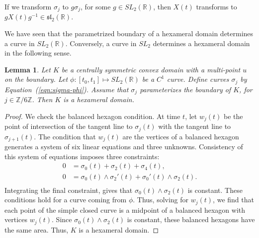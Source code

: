 \documentclass[11pt]{amsart}
\newtheorem{lemma}{Lemma}
\newcommand{\ring}[1]{\mathbb{#1}}
\def\rR{{\ring{R}}}
\begin{document}
If we transform $\sigma_j$ to $g\sigma_j$, for some $g\in SL_2(\rR)$,
then $X(t)$ transforms to $g X(t) g^{-1}\in \mathfrak{sl}_2(\rR)$.

We have seen that the parametrized boundary of a 
hexameral domain determines a curve in $SL_2(\ring{R})$.
Conversely, a curve in $SL_2$ determines a hexameral domain in the
following sense.

\begin{lemma}\label{lemma:sl2-rein}  
Let $K$ be a centrally symmetric convex domain with a multi-point
$u$ on the boundary.
Let $\phi:[t_0,t_1]\mapsto SL_2(\ring{R})$ be a $C^1$ curve. %
Define curves $\sigma_j$ by Equation~(\ref{eqn:sigma-phi}).
Assume that $\sigma_j$ parameterizes
the boundary of $K$,
 for $j\in\ring{Z}/6\ring{Z}$.
Then
$K$ is a hexameral domain.
\end{lemma}

\begin{proof} 
We check the balanced hexagon condition.
At time $t$, let $w_j(t)$ be the point of intersection of the tangent line to
$\sigma_j(t)$ with the tangent line to $\sigma_{j+1}(t)$.  The condition that $w_j(t)$ are the vertices of a balanced
hexagon generates a  system of six linear equations and three unknowns.  Consistency of this system
of equations imposes  three  constraints:
   $$
   \begin{array}{lll}
   0 &= \sigma_0(t) + \sigma_2(t) + \sigma_4(t),\\
   0 &= {\sigma_0(t)}\land{\sigma_2'(t)}+ {\sigma_0'(t)}\land{\sigma_2(t)}.\\
   \end{array}
   $$
Integrating the final constraint, gives that ${\sigma_0(t)}\land{\sigma_2(t)}$ is constant.  These conditions
hold for a curve coming from $\phi$.  Thus, solving for $w_j(t)$, we find that each point of the simple closed curve is a midpoint of a 
balanced hexagon with vertices $w
_j(t)$.  
Since ${\sigma_0(t)}\land{\sigma_2(t)}$ is constant, these balanced hexagons have the
same area.  Thus, $K$ is a hexameral domain.
\end{proof}
\end{document}
